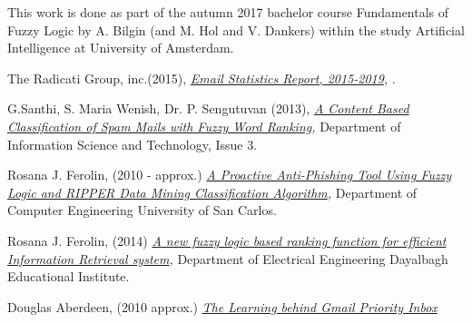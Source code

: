 \documentclass[journal]{IEEEtran}
\begin{document}
This work is done as part of the autumn 2017 bachelor course Fundamentals of Fuzzy Logic by A. Bilgin (and  M. Hol and V. Dankers) within the study Artificial Intelligence at University of Amsterdam.

\begin{thebibliography}{9}
    The Radicati Group, inc.(2015),
    \textit{
        \href{https://github.com/Menziess/Fuzzy-Logic-Email-Classification/raw/master/report/res/a_new_fuzzy_logic_based_ranking_function_for_efficient_information_retrieval_system.pdf}{Email Statistics Report, 2015-2019},
    }.

    G.Santhi, S. Maria Wenish, Dr. P. Sengutuvan (2013),
    \textit{
        \href{https://github.com/Menziess/Fuzzy-Logic-Email-Classification/raw/master/report/res/a_content_based_classification_of_spam_mails_with_fuzzy_word_ranking.pdf}{A Content Based Classification of Spam Mails with Fuzzy Word Ranking},
    }
    Department of Information Science and Technology,
    Issue 3.

    Rosana J. Ferolin, (2010 - approx.)
    \textit{
        \href{https://github.com/Menziess/Fuzzy-Logic-Email-Classification/raw/master/report/res/a_proactive_anti-phishing_tool_using_fuzzy_logic_and_ripper_data_mining_classification_algorithm.pdf}{A Proactive Anti-Phishing Tool Using Fuzzy Logic and RIPPER Data Mining Classification Algorithm},
    }
    Department of Computer Engineering University of San Carlos.

    Rosana J. Ferolin, (2014)
    \textit{
        \href{https://github.com/Menziess/Fuzzy-Logic-Email-Classification/raw/master/report/res/a_new_fuzzy_logic_based_ranking_function_for_efficient_information_retrieval_system.pdf}{A new fuzzy logic based ranking function for efficient Information Retrieval system},
    }
    Department of Electrical Engineering Dayalbagh Educational Institute.

    Douglas Aberdeen, (2010 approx.)
    \textit{
        \href{[nog toevoegen}{The Learning behind Gmail Priority Inbox}
    }

\end{thebibliography}
\end{document}
